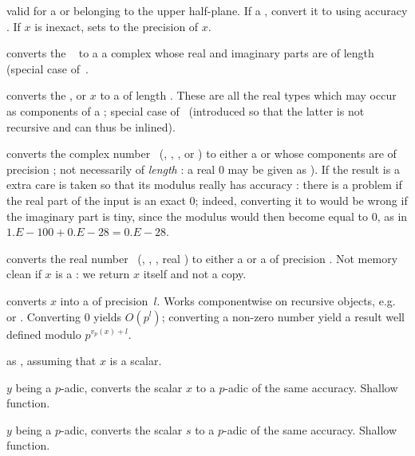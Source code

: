  valid for a 
or  belonging to the upper half-plane. If a , convert it
to  using accuracy . If $x$ is inexact, sets
 to the precision of $x$.

 converts the ~ to a
a complex whose real and imaginary parts are  of length 
(special case of~.

 converts the
,  or  $x$ to a  of length .
These are all the real types which may occur as components of a
; special case of~ (introduced so that the latter is
not recursive and can thus be inlined).

 converts the complex number~
(, , ,  or ) to either
a  or  whose components are  of precision
; not necessarily of \emph{length} : a real $0$ may be
given as ). If the result is a  extra care is
taken so that its modulus really has accuracy : there is a problem
if the real part of the input is an exact $0$; indeed, converting it to
 would be wrong if the imaginary part is tiny, since the
modulus would then become equal to $0$, as in $1.E-100 + 0.E-28 = 0.E-28$.

 converts the real number~
(, , , real ) to either
a  or a  of precision . Not memory clean
if $x$ is a : we return $x$ itself and not a copy.

 converts $x$ into a 
of precision~$l$. Works componentwise on recursive objects,
e.g.~ or . Converting $0$ yields $O(p^l)$; converting a
non-zero number yield a result well defined modulo $p^{v_p(x) + l}$.

 as , assuming that $x$
is a scalar.

 $y$ being a $p$-adic, converts the scalar $x$
to a $p$-adic of the same accuracy. Shallow function.

 $y$ being a $p$-adic, converts the scalar $s$
to a $p$-adic of the same accuracy. Shallow function.

